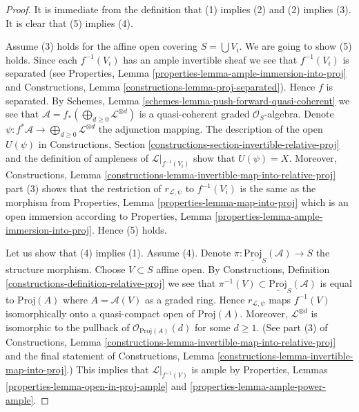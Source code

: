 \begin{proof}
It is immediate from the definition that (1) implies (2) and
(2) implies (3). It is clear that (5) implies (4).

\medskip\noindent
Assume (3) holds for the affine open covering $S = \bigcup V_i$.
We are going to show (5) holds.
Since each $f^{-1}(V_i)$ has an ample invertible sheaf we see
that $f^{-1}(V_i)$ is separated (see
Properties, Lemma \ref{properties-lemma-ample-immersion-into-proj} and
Constructions, Lemma \ref{constructions-lemma-proj-separated}).
Hence $f$ is separated. By
Schemes, Lemma \ref{schemes-lemma-push-forward-quasi-coherent}
we see that $\mathcal{A} = f_*(\bigoplus_{d \geq 0} \mathcal{L}^{\otimes d})$
is a quasi-coherent graded $\mathcal{O}_S$-algebra.
Denote $\psi : f^*\mathcal{A} \to \bigoplus_{d \geq 0} \mathcal{L}^{\otimes d}$
the adjunction mapping.
The description of the open $U(\psi)$ in
Constructions, Section
\ref{constructions-section-invertible-relative-proj}
and the definition of ampleness
of $\mathcal{L}|_{f^{-1}(V_i)}$ show that $U(\psi) = X$.
Moreover, Constructions,
Lemma \ref{constructions-lemma-invertible-map-into-relative-proj} part (3)
shows that the restriction of $r_{\mathcal{L}, \psi}$ to
$f^{-1}(V_i)$ is the same as the morphism from
Properties, Lemma \ref{properties-lemma-map-into-proj}
which is an open immersion according to
Properties, Lemma \ref{properties-lemma-ample-immersion-into-proj}.
Hence (5) holds.

\medskip\noindent
Let us show that (4) implies (1). Assume (4).
Denote $\pi : \underline{\text{Proj}}_S(\mathcal{A}) \to S$
the structure morphism. Choose $V \subset S$ affine open. By
Constructions, Definition \ref{constructions-definition-relative-proj}
we see that $\pi^{-1}(V) \subset \underline{\text{Proj}}_S(\mathcal{A})$
is equal to $\text{Proj}(A)$ where $A = \mathcal{A}(V)$
as a graded ring. Hence $r_{\mathcal{L}, \psi}$ maps
$f^{-1}(V)$ isomorphically onto
a quasi-compact open of $\text{Proj}(A)$.
Moreover, $\mathcal{L}^{\otimes d}$ is isomorphic to the pullback of
$\mathcal{O}_{\text{Proj}(A)}(d)$ for some $d \geq 1$.
(See part (3) of Constructions,
Lemma \ref{constructions-lemma-invertible-map-into-relative-proj}
and the final statement of Constructions,
Lemma \ref{constructions-lemma-invertible-map-into-proj}.)
This implies that $\mathcal{L}|_{f^{-1}(V)}$ is ample by
Properties, Lemmas \ref{properties-lemma-open-in-proj-ample}
and \ref{properties-lemma-ample-power-ample}.


\end{proof}
